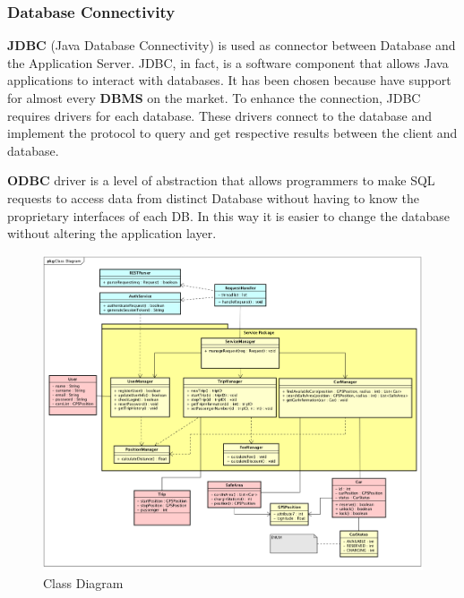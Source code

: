 \subsubsection{Database Connectivity} \textbf{JDBC} (Java Database Connectivity) is used as connector between Database and the Application Server. JDBC, in fact, is a software component that allows Java applications to interact with databases. It has been chosen because have support for almost every \textbf{DBMS} on the market.
To enhance the connection, JDBC requires drivers for each database. These drivers connect to the database and implement the protocol to query and get respective results between the client and database. 


\textbf{ODBC} driver is a level of abstraction that allows programmers to make SQL requests to access data from distinct Database without having to know the proprietary interfaces of each DB. In this way it is easier to change the database without altering the application layer.


\begin{figure}[H]	
	\centering
	\includegraphics[width=\textwidth]{img/class_diagram}
	\caption{Class Diagram}
\end{figure}


